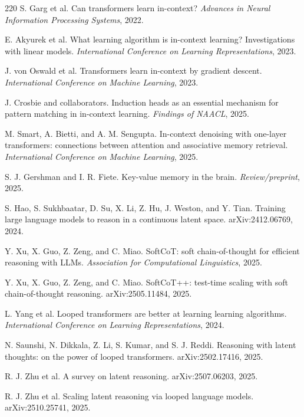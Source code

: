 \documentclass[11pt]{article}
\newcommand{\1}{\mathbf{1}}
\begin{document}
\begin{thebibliography}{220}
S. Garg et al. Can transformers learn in-context? \emph{Advances in Neural Information Processing Systems}, 2022.

E. Akyurek et al. What learning algorithm is in-context learning? Investigations with linear models. \emph{International Conference on Learning Representations}, 2023.

J. von Oswald et al. Transformers learn in-context by gradient descent. \emph{International Conference on Machine Learning}, 2023.

J. Crosbie and collaborators. Induction heads as an essential mechanism for pattern matching in in-context learning. \emph{Findings of NAACL}, 2025.

M. Smart, A. Bietti, and A. M. Sengupta. In-context denoising with one-layer transformers: connections between attention and associative memory retrieval. \emph{International Conference on Machine Learning}, 2025.

S. J. Gershman and I. R. Fiete. Key-value memory in the brain. \emph{Review/preprint}, 2025.

S. Hao, S. Sukhbaatar, D. Su, X. Li, Z. Hu, J. Weston, and Y. Tian. Training large language models to reason in a continuous latent space. arXiv:2412.06769, 2024.

Y. Xu, X. Guo, Z. Zeng, and C. Miao. SoftCoT: soft chain-of-thought for efficient reasoning with LLMs. \emph{Association for Computational Linguistics}, 2025.

Y. Xu, X. Guo, Z. Zeng, and C. Miao. SoftCoT++: test-time scaling with soft chain-of-thought reasoning. arXiv:2505.11484, 2025.

L. Yang et al. Looped transformers are better at learning learning algorithms. \emph{International Conference on Learning Representations}, 2024.

N. Saunshi, N. Dikkala, Z. Li, S. Kumar, and S. J. Reddi. Reasoning with latent thoughts: on the power of looped transformers. arXiv:2502.17416, 2025.

R. J. Zhu et al. A survey on latent reasoning. arXiv:2507.06203, 2025.

R. J. Zhu et al. Scaling latent reasoning via looped language models. arXiv:2510.25741, 2025.


\end{thebibliography}
\end{document}

